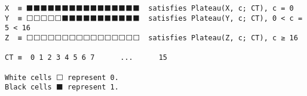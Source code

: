\documentclass[varwidth=\maxdimen,margin=0.5cm,multi={verbatim}]{standalone}
\begin{document}
\begin{verbatim}
X  ≡ ⬛⬛⬛⬛⬛⬛⬛⬛⬛⬛⬛⬛⬛⬛⬛⬛  satisfies Plateau(X, c; CT), c = 0
Y  ≡ ⬜⬜⬜⬜⬜⬛⬛⬛⬛⬛⬛⬛⬛⬛⬛⬛  satisfies Plateau(Y, c; CT), 0 < c = 5 < 16
Z  ≡ ⬜⬜⬜⬜⬜⬜⬜⬜⬜⬜⬜⬜⬜⬜⬜⬜  satisfies Plateau(Z, c; CT), c ≥ 16

CT ≡  0 1 2 3 4 5 6 7      ...      15
            
White cells ⬜ represent 0.
Black cells ⬛ represent 1.
\end{verbatim}
\end{document}
